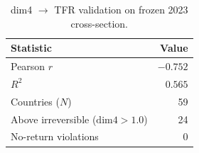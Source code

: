 \begin{table}[h]
\centering
\begin{tabular}{lr}
\toprule
Statistic & Value \\
\midrule
Pearson $r$ & $-0.752$ \\
$R^2$ & $0.565$ \\
Countries ($N$) & 59 \\
Above irreversible ($\mathrm{dim4} > 1.0$) & 24 \\
No-return violations & 0 \\
\bottomrule
\end{tabular}
\caption{dim4 $\rightarrow$ TFR validation on frozen 2023 cross-section.}
\label{tab:validation}
\end{table}